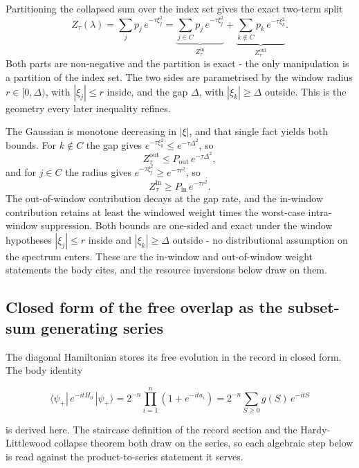 Partitioning the collapsed sum over the index set gives the exact two-term split
\begin{equation*}
Z_\tau(\lambda) = \sum_j p_j \, e^{-\tau \xi_j^2}
= \underbrace{\sum_{j \in C} p_j \, e^{-\tau \xi_j^2}}_{Z_\tau^{\mathrm{in}}}
+ \underbrace{\sum_{k \notin C} p_k \, e^{-\tau \xi_k^2}}_{Z_\tau^{\mathrm{out}}} .
\end{equation*}
Both parts are non-negative and the partition is exact - the only manipulation is a partition of the index set. The two sides are parametrised by the window radius $r \in [0, \Delta)$, with $|\xi_j| \le r$ inside, and the gap $\Delta$, with $|\xi_k| \ge \Delta$ outside. This is the geometry every later inequality refines.

The Gaussian is monotone decreasing in $|\xi|$, and that single fact yields both bounds. For $k \notin C$ the gap gives $e^{-\tau \xi_k^2} \le e^{-\tau \Delta^2}$, so
\begin{equation*}
Z_\tau^{\mathrm{out}} \le P_{\mathrm{out}} \, e^{-\tau \Delta^2} ,
\end{equation*}
and for $j \in C$ the radius gives $e^{-\tau \xi_j^2} \ge e^{-\tau r^2}$, so
\begin{equation*}
Z_\tau^{\mathrm{in}} \ge P_{\mathrm{in}} \, e^{-\tau r^2} .
\end{equation*}
The out-of-window contribution decays at the gap rate, and the in-window contribution retains at least the windowed weight times the worst-case intra-window suppression. Both bounds are one-sided and exact under the window hypotheses $|\xi_j| \le r$ inside and $|\xi_k| \ge \Delta$ outside - no distributional assumption on the spectrum enters. These are the in-window and out-of-window weight statements the body cites, and the resource inversions below draw on them.

\subsection*{Closed form of the free overlap as the subset-sum generating series}

The diagonal Hamiltonian stores its free evolution in the record in closed form. The body identity
\begin{widetext}
\begin{equation*}
\langle \psi_+ | \, e^{-i t H_0} \, | \psi_+ \rangle
= 2^{-n} \prod_{i=1}^{n} \left( 1 + e^{-i t a_i} \right)
= 2^{-n} \sum_{S \ge 0} g(S) \, e^{-i t S}
\end{equation*}
\end{widetext}
is derived here. The staircase definition of the record section and the Hardy-Littlewood collapse theorem both draw on the series, so each algebraic step below is read against the product-to-series statement it serves.

